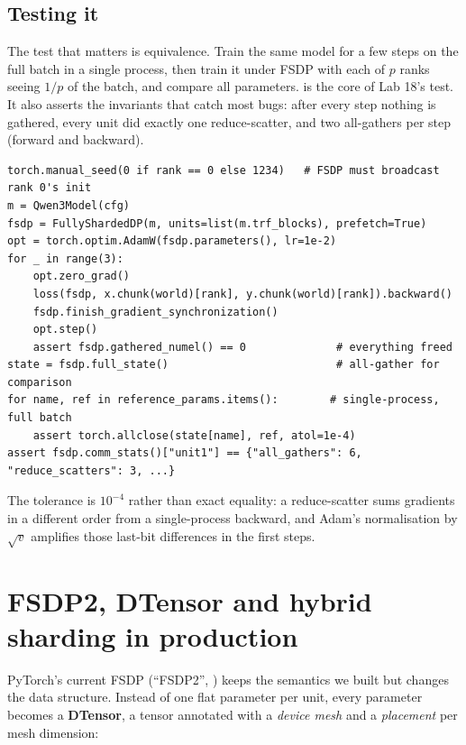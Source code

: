 \subsection{Testing it}

The test that matters is equivalence. Train the same model for a few steps on the full batch in a
single process, then train it under FSDP with each of $p$ ranks seeing $1/p$ of the batch, and
compare all parameters.  is the core of Lab 18's test. It also asserts the
invariants that catch most bugs: after every step nothing is gathered, every unit did exactly one
reduce-scatter, and two all-gathers per step (forward and backward).

\begin{lstlisting}[caption={Equivalence and invariant checks for FSDP (inside each of 3 ranks).},label={lst:sharding:test}]
torch.manual_seed(0 if rank == 0 else 1234)   # FSDP must broadcast rank 0's init
m = Qwen3Model(cfg)
fsdp = FullyShardedDP(m, units=list(m.trf_blocks), prefetch=True)
opt = torch.optim.AdamW(fsdp.parameters(), lr=1e-2)
for _ in range(3):
    opt.zero_grad()
    loss(fsdp, x.chunk(world)[rank], y.chunk(world)[rank]).backward()
    fsdp.finish_gradient_synchronization()
    opt.step()
    assert fsdp.gathered_numel() == 0              # everything freed
state = fsdp.full_state()                          # all-gather for comparison
for name, ref in reference_params.items():        # single-process, full batch
    assert torch.allclose(state[name], ref, atol=1e-4)
assert fsdp.comm_stats()["unit1"] == {"all_gathers": 6, "reduce_scatters": 3, ...}
\end{lstlisting}

The tolerance is $10^{-4}$ rather than exact equality: a reduce-scatter sums gradients in a
different order from a single-process backward, and Adam's normalisation by $\sqrt{v}$ amplifies
those last-bit differences in the first steps.

\section{FSDP2, DTensor and hybrid sharding in production}\label{sec:sharding:fsdp2}

PyTorch's current FSDP (``FSDP2'', ) keeps the
semantics we built but changes the data structure. Instead of one flat parameter per unit, every
parameter becomes a \textbf{DTensor}, a tensor annotated with a \emph{device mesh} and a
\emph{placement} per mesh dimension:

